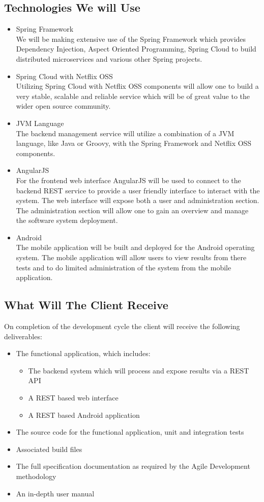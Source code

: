 \subsection{Technologies We will Use}
\begin{itemize}
	\item Spring Framework \\
		We will be making extensive use of the Spring Framework which provides Dependency Injection, Aspect Oriented Programming, Spring Cloud to build distributed microservices and various other Spring projects.
	\item Spring Cloud with Netflix OSS \\
		Utilizing Spring Cloud with Netflix OSS components will allow one to build a very stable, scalable and reliable service which will be of great value to the wider open source community.
	\item JVM Language \\
		The backend management service will utilize a combination of a JVM language, like Java or Groovy, with the Spring Framework and Netflix OSS components.
	\item AngularJS \\
		For the frontend web interface AngularJS will be used to connect to the backend REST service to provide a user friendly interface to interact with the system. The web interface will expose both a user and administration section. The administration section will allow one to gain an overview and manage the software system deployment.
	\item Android \\
		The mobile application will be built and deployed for the Android operating system. The mobile application will allow users to view results from there tests and to do limited administration of the system from the mobile application.
	\end{itemize}

  \subsection{What Will The Client Receive}
  On completion of the development cycle the client will receive the following deliverables:
  \begin{itemize}
  	\item The functional application, which includes:
  	\begin{itemize}
  		\item The backend system which will process and expose results via a REST API
  		\item A REST based web interface
  		\item A REST based Android application
  	\end{itemize}
  	\item The source code for the functional application, unit and integration tests
  	\item Associated build files
  	\item The full specification documentation as required by the Agile Development methodology
  	\item An in-depth user manual
  \end{itemize}
